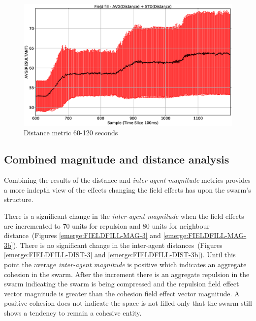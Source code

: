 \begin{figure}[H]
\begin{center}
\includegraphics[width=12cm]{CHAPTER-8/figures/FIELDFILL-DIST-2}
\end{center}
\caption{Distance metric 60-120 seconds\label{emerge:FIELDFILL-DIST-2}}
\end{figure}

\subsection{Combined magnitude and distance analysis}
Combining the results of the distance and \textit{inter-agent magnitude} metrics provides a more indepth view of the effects changing the field effects has upon the swarm's structure.

There is a significant change in the \textit{inter-agent magnitude} when the field effects are incremented to 70 units for repulsion and 80 units for neighbour distance~(Figures \ref{emerge:FIELDFILL-MAG-3} and \ref{emerge:FIELDFILL-MAG-3b}). There is no significant change in the inter-agent distances~(Figures \ref{emerge:FIELDFILL-DIST-3} and \ref{emerge:FIELDFILL-DIST-3b}). Until this point the average \textit{inter-agent magnitude} is positive which indicates an aggregate cohesion in the swarm. After the increment there is an aggregate repulsion in the swarm indicating the swarm is being compressed and the repulsion field effect vector magnitude is greater than the cohesion field effect vector magnitude. A positive cohesion does not indicate the space is not filled only that the swarm still shows a tendency to remain a cohesive entity.

